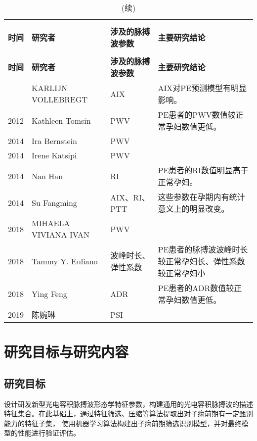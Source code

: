 \begin{center}
	\begin{longtable}{m{1cm}<{\centering}m{3cm}<{\centering}m{3cm}<{\centering}m{7cm}<{\centering}}
		\caption{基于脉搏波的PE研究小结}\\
		\label{tab:PPGinPE}\\
        \toprule
        \textbf{时间}&\textbf{研究者}&\textbf{涉及的脉搏波参数}&\textbf{主要研究结论}\\
        \midrule
        \endfirsthead
        \caption[]{(续)}\\
        \midrule
        \textbf{时间}&\textbf{研究者}&\textbf{涉及的脉搏波参数}&\textbf{主要研究结论}\\
        \midrule
        \endhead 
        \midrule
        \endfoot
        \bottomrule
        \endlastfoot
        2008    &   KARLIJN VOLLEBREGT\cite{KARLIJN2008}    &   AIX     &   AIX对PE预测模型有明显影响。\\
        2012    &   Kathleen Tomsin\cite{Tomsin2012}    &   PWV     &   PE患者的PWV数值较正常孕妇数值更低。 \\
        2014    &   Ira Bernstein\cite{Ira2014}     &   PWV &   \\
        2014    &   Irene Katsipi\cite{Katsipi2014}     &   PWV &   \\
        2014    &   Nan Han\cite{Han2014}     &   RI &  PE患者的RI数值明显高于正常孕妇。 \\
        2014    &   Su Fangming\cite{Su2014}    &   AIX、RI、PTT    &   这些参数在孕期内有统计意义上的明显改变。\\
        2018    &   MIHAELA VIVIANA IVAN\cite{VivianaIvan2018}     &   PWV &   \\
        2018    &   Tammy Y. Euliano\cite{Euliano2018}     &   波峰时长、弹性系数 &   PE患者的脉搏波波峰时长较正常孕妇长、弹性系数较正常孕妇小\\
        2018    &   Ying Feng\cite{Feng2018}    &   ADR &  PE患者的ADR数值较正常孕妇数值更低。 \\
        2019    &   陈婉琳\cite{Chen2019}     &   PSI &   \\
	\end{longtable}
\end{center}

\section{研究目标与研究内容}

\subsection{研究目标}
设计研发新型光电容积脉搏波形态学特征参数，构建通用的光电容积脉搏波的描述特征集合。在此基础上，通过特征筛选、压缩等算法提取出对子痫前期有一定甄别能力的特征子集，
使用机器学习算法构建出子痫前期筛选识别模型，并对最终模型的性能进行验证评估。
